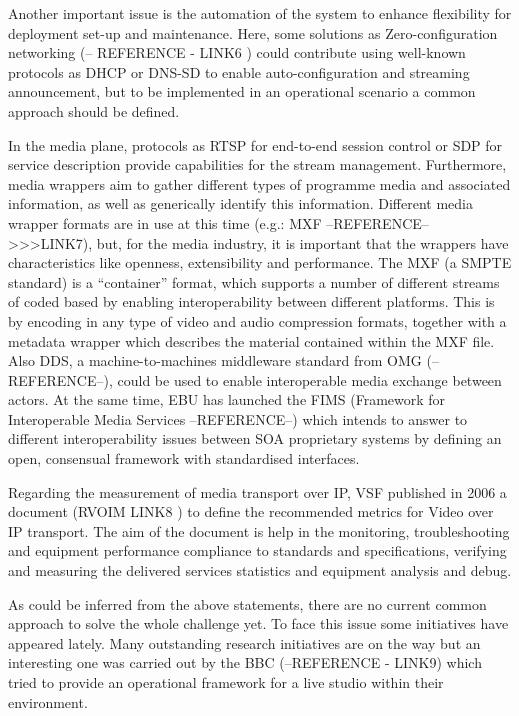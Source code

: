 Another important issue is the automation of the system to enhance flexibility for deployment set-up and maintenance. Here, some solutions as Zero-configuration networking (-- REFERENCE - LINK6 ) could contribute using well-known protocols as DHCP or DNS-SD to enable auto-configuration and streaming announcement, but to be implemented in an operational scenario a common approach should be defined.

In the media plane, protocols as RTSP for end-to-end session control or SDP for service description provide capabilities for the stream management. Furthermore, media wrappers aim to gather different types of programme media and associated information, as well as generically identify this information. Different media wrapper formats are in use at this time (e.g.: MXF --REFERENCE-->>>LINK7), but, for the media industry, it is important that the wrappers have characteristics like openness, extensibility and performance. The MXF (a SMPTE standard) is a “container” format, which supports a number of different streams of coded based by enabling interoperability between different platforms. This is by encoding in any type of video and audio compression formats, together with a metadata wrapper which describes the material contained within the MXF file. Also DDS, a machine-to-machines middleware standard from OMG (--REFERENCE--), could be used to enable interoperable media exchange between actors. At the same time, EBU has launched the FIMS (Framework for Interoperable Media Services --REFERENCE--) which intends to answer to different interoperability issues between SOA proprietary systems by defining an open, consensual framework with standardised interfaces.

Regarding the measurement of media transport over IP, VSF published in 2006 a document (RVOIM LINK8 ) to define the recommended metrics for Video over IP transport. The aim of the document is help in the monitoring, troubleshooting and equipment performance compliance to standards and specifications, verifying and measuring the delivered services statistics and equipment analysis and debug.

As could be inferred from the above statements, there are no current common approach to solve the whole challenge yet. To face this issue some initiatives have appeared lately. Many outstanding research initiatives are on the way but an interesting one was carried out by the BBC (--REFERENCE - LINK9) which tried to provide an operational framework for a live studio within their environment.

